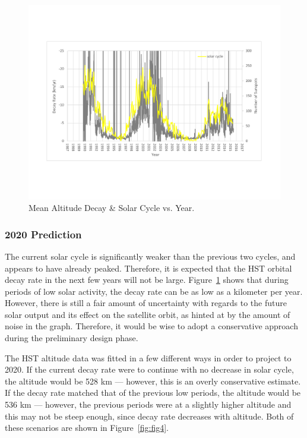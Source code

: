 \documentclass[paper=letter, fontsize=11pt]{scrartcl} %
\numberwithin{equation}{section} %
\numberwithin{figure}{section} %
\numberwithin{table}{section} %
\begin{document}
\begin{figure}[H]
\begin{center}
\includegraphics[width=1\textwidth]{figs2/3.pdf}
\caption{Mean Altitude Decay \& Solar Cycle vs. Year.}
\label{fig:fig3}
\end{center}
\end{figure}


\subsubsection{2020 Prediction}
The current solar cycle is significantly weaker than the previous two cycles, and appears to have already peaked. Therefore, it is expected that the HST orbital decay rate in the next few years will not be large. Figure~\ref{fig:fig3} shows that during periods of low solar activity, the decay rate can be as low as a kilometer per year. However, there is still a fair amount of uncertainty with regards to the future solar output and its effect on the satellite orbit, as hinted at by the amount of noise in the graph. Therefore, it would be wise to adopt a conservative approach during the preliminary design phase.

The HST altitude data was fitted in a few different ways in order to project to 2020. If the current decay rate were to continue with no decrease in solar cycle, the altitude would be 528 km --- however, this is an overly conservative estimate. If the decay rate matched that of the previous low periods, the altitude would be 536 km --- however, the previous periods were at a slightly higher altitude and this may not be steep enough, since decay rate decreases with altitude. Both of these scenarios are shown in Figure~\ref{fig:fig4}.
\end{document}
